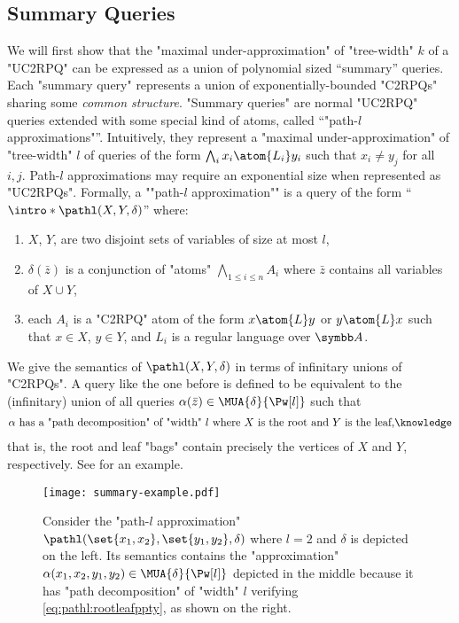 \subsection{\AP{}Summary Queries}
We will first show that the "maximal under-approximation" of "tree-width" $k$ of a "UC2RPQ" can be expressed as a union of polynomial sized ``summary'' queries. Each "summary query" represents a union of exponentially-bounded "C2RPQs" sharing some \emph{common structure}. 
"Summary queries" are normal "UC2RPQ" queries extended with some special kind of atoms, called ``"path-$l$ approximations"''. 
Intuitively, they represent a "maximal under-approximation" of "tree-width" $l$ of queries of the form $\bigwedge_i x_i \atom{L_i} y_i$ such that $x_i \neq y_j$ for all $i,j$. 
Path-$l$ approximations may require an exponential size when represented as "UC2RPQs".
%
\AP Formally, a ""path-$l$ approximation"" is a query of the form ``$\intro*\pathl(X, Y, \delta)$''
where: 
\begin{enumerate}
	\item $X$, $Y$, are two disjoint sets of variables of size at most $l$, 
	\item $\delta(\bar z)$ is a conjunction of "atoms" $\bigwedge_{1 \leq i \leq n} A_i$ where $\bar z$ contains all variables of $X \cup Y$,
	\item each $A_i$ is a "C2RPQ" atom of the form $x \atom{L} y$ or $y \atom{L} x$  such that $x \in X$, $y \in Y$, and $L_i$ is a regular language over $\A$.
\end{enumerate}
We give the semantics of $\pathl(X, Y, \delta)$ in terms of infinitary unions of "C2RPQs".
A query like the one before is defined to be equivalent to the (infinitary) union of all queries $\alpha(\bar z) \in \MUA{\delta}{\Pw[l]}$ such that
\begin{align}
	\text{$\alpha$ has a "path decomposition" of "width" $l$ where $X$ is the root and $Y$ is the leaf,}\AP\label{eq:pathl:rootleafppty}
\end{align}
that is, the root and leaf "bags" contain precisely the vertices of $X$ and $Y$, respectively.
 See  for an example.
\begin{figure*}
  \centering
  \texttt{[image: summary-example.pdf]}
  \caption{
	\AP\label{fig:l-path-example}
	Consider the "path-$l$ approximation" $\pathl(\set{x_1,x_2}, \set{y_1,y_2},\delta)$ where $l=2$ and $\delta$ is depicted on the left. Its semantics contains the "approximation" $\alpha(x_1,x_2,y_1,y_2) \in \MUA{\delta}{\Pw[l]}$ depicted in the middle because it has "path decomposition" of "width" $l$ verifying \eqref{eq:pathl:rootleafppty}, as shown on the right.
	}
\end{figure*}

